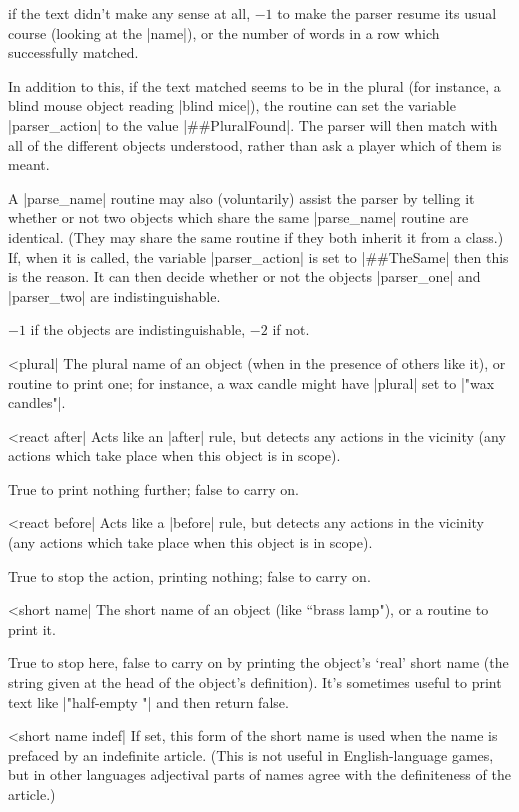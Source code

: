  if the text didn't make any sense at all, $-1$ to make the parser resume
its usual course (looking at the |name|), or the number of words in a row
which successfully matched.

\noindent In addition to this, if the text matched seems to be in the plural
(for instance, a blind mouse object reading |blind mice|), the routine can
set the variable |parser_action| to the value |##PluralFound|.  The parser
will then match with all of the different objects understood, rather than
ask a player which of them is meant.

\noindent A |parse_name| routine may also (voluntarily) assist the parser
by telling it whether or not two objects which share the same |parse_name|
routine are identical.  (They may share the same routine if they both inherit
it from a class.)  If, when it is called, the variable |parser_action| is
set to |##TheSame| then this is the reason.  It can then decide whether or
not the objects |parser_one| and |parser_two| are indistinguishable.

\rr $-1$ if the objects are indistinguishable, $-2$ if not.

^^|plural|
\fo The plural name of an object (when in the presence of others like it),
or routine to print one; for instance, a wax candle might have |plural| set
to |"wax candles"|.

\nrr

^^|react after|
\fo Acts like an |after| rule, but detects any actions in the vicinity
(any actions which take place when this object is in scope).

\rr True to print nothing further; false to carry on.

^^|react before|
\fo Acts like a |before| rule, but detects any actions in the vicinity
(any actions which take place when this object is in scope).

\rr True to stop the action, printing nothing; false to carry on.

^^|short name|
\fo The short name of an object (like ``brass lamp"), or a routine to print
it.

\rr True to stop here, false to carry on by printing the object's `real'
short name (the string given at the head of the object's definition).  It's
sometimes useful to print text like |"half-empty "| and then return false.

^^|short name indef|
\fo If set, this form of the short name is used
when the name is prefaced by an indefinite article.  (This
is not useful in English-language games, but in other
languages adjectival parts of names agree with the
definiteness of the article.)


